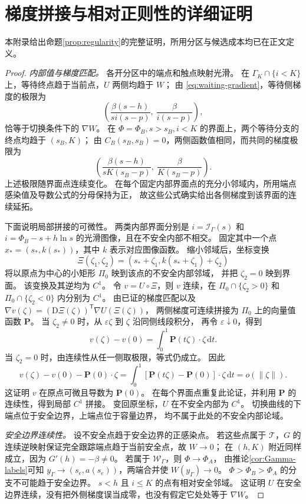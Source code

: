 \documentclass[11pt,a4paper,UTF8]{ctexart}
\theoremstyle{definition}
\newcommand{\dd}{\,\mathrm d}
\begin{document}
\section{梯度拼接与相对正则性的详细证明}
\label{app:regularity-proof}
本附录给出命题\ref{prop:regularity}的完整证明，所用分区与候选成本均已在正文定义。
\begin{proof}
\emph{内部值与梯度匹配。}
各开分区中的端点和触点映射光滑。
在 $\Gamma_K\cap\{i<K\}$ 上，等待终点趋于当前点，$U$ 两侧均趋于 $W$；
由 \eqref{eq:waiting-gradient}，等待侧梯度的极限为
\[
\left(\frac{\beta(s-h)}{si(s-p)},\ \frac{\beta}{i(s-p)}\right),
\]
恰等于切换条件下的 $\nabla W$。
在 $\Phi=\Phi_B,s>s_B,i<K$ 的界面上，两个等待分支的终点均趋于 $(s_B,K)$；
由 $C_B(s_B,s_B)=0$，两侧函数值相同，而共同的梯度极限为
\[
\left(\frac{\beta(s-h)}{sK(s_B-p)},\ \frac{\beta}{K(s_B-p)}\right).
\]
上述极限随界面点连续变化。
在每个固定内部界面点的充分小邻域内，所用端点感染值及导数公式的分母保持为正，
故这些公式确实给出各侧梯度到该界面的连续延拓。

下面说明局部拼接的可微性。
两类内部界面分别是 $i=\mathcal I_\Gamma(s)$ 和
$i=\Phi_B-s+h\ln s$ 的光滑图像，且在不安全内部不相交。
固定其中一个点 $x_*=(s_*,k(s_*))$，其中 $k$ 表示对应图像函数。
缩小邻域后，坐标变换
\[
\Xi(\zeta_1,\zeta_2)=(s_*+\zeta_1,k(s_*+\zeta_1)+\zeta_2)
\]
将以原点为中心的小矩形 $\Pi_0$ 映到该点的不安全内部邻域，
并把 $\zeta_2=0$ 映到界面。
该变换及其逆均为 $C^1$。
令 $v=U\circ\Xi$，则 $v$ 连续，在 $\Pi_0\cap\{\zeta_2>0\}$ 和
$\Pi_0\cap\{\zeta_2<0\}$ 内分别为 $C^1$。
由已证的梯度匹配以及
$\nabla v(\zeta)=(\mathrm D\Xi(\zeta))^{\mathsf T}\nabla U(\Xi(\zeta))$，
两侧梯度可连续拼接为 $\Pi_0$ 上的向量值函数 $\mathbf P$。
当 $\zeta_2\ne0$ 时，从 $\varepsilon \zeta$ 到 $\zeta$ 沿同侧线段积分，
再令 $\varepsilon\downarrow0$，得到
\[
v(\zeta)-v(0)=\int_0^1 \mathbf P(t\zeta)\cdot \zeta\dd t.
\]
当 $\zeta_2=0$ 时，由连续性从任一侧取极限，等式仍成立。
因此
\[
v(\zeta)-v(0)-\mathbf P(0)\cdot \zeta
=\int_0^1 [\mathbf P(t\zeta)-\mathbf P(0)]\cdot \zeta\dd t
=o(\lVert \zeta\rVert).
\]
这证明 $v$ 在原点可微且导数为 $\mathbf P(0)$。
在每个界面点重复此论证，并利用 $\mathbf P$ 的连续性，得到局部 $C^1$ 拼接。
变回原坐标，$U$ 在不安全内部为 $C^1$。
切换曲线的下端点位于安全边界，上端点位于容量边界，
均不属于此处的不安全内部论域。

\emph{安全边界连续性。}
设不安全点趋于安全边界的正感染点。
若这些点属于 $\mathcal T$，$G$ 的连续逆映射保证完全跟踪端点趋于当前安全点，故 $W\to0$；
在 $(h,K)$ 附近同样成立，因为 $G'(h)=-\beta\ne0$。
若属于 $\mathcal W_\Gamma$，则 $\Phi\to\Phi_A$，
由推论\ref{cor:Gamma-labels}可知 $y_\Gamma\to(s_e,a(s_e))$，两端合并使 $W(y_\Gamma)\to0$。
$\Phi>\Phi_B>\Phi_A$ 的分支不可能趋于安全边界。
$s<h$ 且 $i\le K$ 的点有相对安全邻域。
这证明 $U$ 在安全边界连续，没有把外侧梯度误当成零，也没有假定它处处等于 $\nabla W$。


\end{proof}
\end{document}
